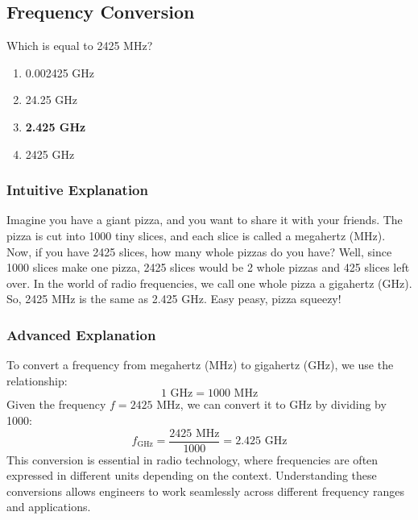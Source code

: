 \subsection{Frequency Conversion}\label{T5B13}

\begin{tcolorbox}[colback=gray!10!white,colframe=black!75!black,title=T5B13]
Which is equal to 2425 MHz?
\begin{enumerate}[label=\Alph*)]
    \item 0.002425 GHz
    \item 24.25 GHz
    \item \textbf{2.425 GHz}
    \item 2425 GHz
\end{enumerate}
\end{tcolorbox}

\subsubsection*{Intuitive Explanation}
Imagine you have a giant pizza, and you want to share it with your friends. The pizza is cut into 1000 tiny slices, and each slice is called a megahertz (MHz). Now, if you have 2425 slices, how many whole pizzas do you have? Well, since 1000 slices make one pizza, 2425 slices would be 2 whole pizzas and 425 slices left over. In the world of radio frequencies, we call one whole pizza a gigahertz (GHz). So, 2425 MHz is the same as 2.425 GHz. Easy peasy, pizza squeezy!

\subsubsection*{Advanced Explanation}
To convert a frequency from megahertz (MHz) to gigahertz (GHz), we use the relationship:
\[
1 \text{ GHz} = 1000 \text{ MHz}
\]
Given the frequency \( f = 2425 \text{ MHz} \), we can convert it to GHz by dividing by 1000:
\[
f_{\text{GHz}} = \frac{2425 \text{ MHz}}{1000} = 2.425 \text{ GHz}
\]
This conversion is essential in radio technology, where frequencies are often expressed in different units depending on the context. Understanding these conversions allows engineers to work seamlessly across different frequency ranges and applications.

